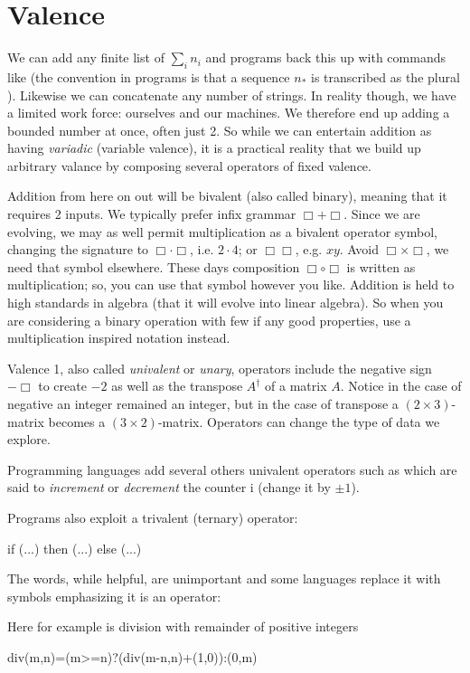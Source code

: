
\section{Valence}
We can add any finite list of $\sum_{i} n_i$ and 
programs back this up with commands like  
(the convention in programs is that a sequence $n_*$ is transcribed as 
the plural ).  Likewise we can concatenate any 
number of strings.  In reality though, we have a limited work force:
ourselves and our machines. We therefore end up adding a bounded number at once,
often just 2.  So while we can entertain addition as having 
\emph{variadic} (variable valence), it is a practical reality that 
we build up arbitrary valance by composing several operators of 
fixed valence.

Addition from here on out will be bivalent (also called binary), meaning 
that it requires 2 inputs.  We typically prefer infix grammar $\Box +\Box$.
Since we are evolving, we may as well permit multiplication as a bivalent operator
symbol, changing the signature to $\Box \cdot \Box$, i.e. $2\cdot 4$; or
$\Box\Box$, e.g. $xy$.   Avoid $\Box\times \Box$, we need that symbol elsewhere.
These days composition $\Box\circ\Box$ is written as multiplication; so, you can
use that symbol however you like.  Addition is held to high standards in algebra
(that it will evolve into linear algebra).  So when you are considering a binary
operation with few if any good properties, use a multiplication inspired
notation instead.   




Valence 1, also called \emph{univalent} or \emph{unary}, operators include the negative sign $-\Box$ to create 
$-2$ as well as the transpose $A^{\dagger}$ of a matrix $A$.
Notice in the case of negative an integer remained an integer, but
 in the case of transpose a $(2\times 3)$-matrix becomes a $(3\times 2)$-matrix.   Operators can change the type of data we explore.
 
Programming languages add several others univalent operators
such as  which are said to \emph{increment} 
or \emph{decrement} the counter i (change it by $\pm 1$).

Programs also exploit a trivalent (ternary) operator:
\begin{center}
\begin{Pcode}[]
if (...) then (...) else (...)
\end{Pcode}
\end{center}
The words, while helpful, are unimportant and some languages
replace it with symbols emphasizing it is an operator:
\begin{center}
\end{center}
Here for example is division with remainder of positive integers
\begin{center}
\begin{Pcode}[]
    div(m,n)=(m>=n)?(div(m-n,n)+(1,0)):(0,m)
\end{Pcode}
\end{center}

